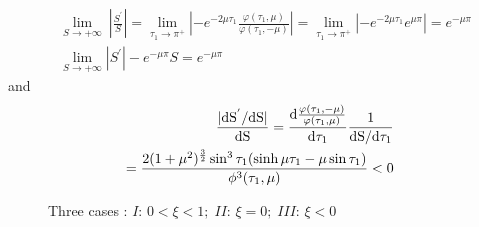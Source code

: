 \documentclass{article}
\begin{document}
\begin{align}
&\lim_{S \rightarrow +\infty}\ |\frac{S^{'}}{S}|=\lim_{\tau_1\rightarrow \pi^+} |-e^{-2\mu\tau_1}\frac{\varphi(\tau_1,\mu)}{\varphi(\tau_1,-\mu)}|=\lim_{\tau_1\rightarrow \pi^+} |-e^{-2\mu\tau_1}e^{\mu \pi}|= e^{-\mu \pi}\\
&\lim_{S \rightarrow +\infty} |S^{'}|-e^{-\mu \pi}S=e^{-\mu \pi}
\label{eq: asymptotic line}
\end{align}
%
and 
\begin{align}
  \nonumber
  \frac{|\rm d S^{'}/\rm d S|}{\rm dS}=\frac{\rm d \frac{\varphi(\tau_1,-\mu)}{\varphi(\tau_1,\mu)}} {\rm d \tau_1} \frac{1}{\rm d S/\rm d \tau_1}\\ 
  = \frac{2(1+\mu^2)^{\frac{3}{2}} \sin^3{\tau_1} (\sinh{\mu \tau_1} - \mu \sin{\tau_1})}{\phi^3(\tau_1,\mu)}<0
\end{align}
\begin{figure}[htbp]
    \centering
    \quad
    \quad
    \caption{Three cases : $I:\,0<\xi<1;\;II:\,\xi=0;\;III:\,\xi<0$}
    \label{fig:three cases for mu}
\end{figure}
\end{document}
